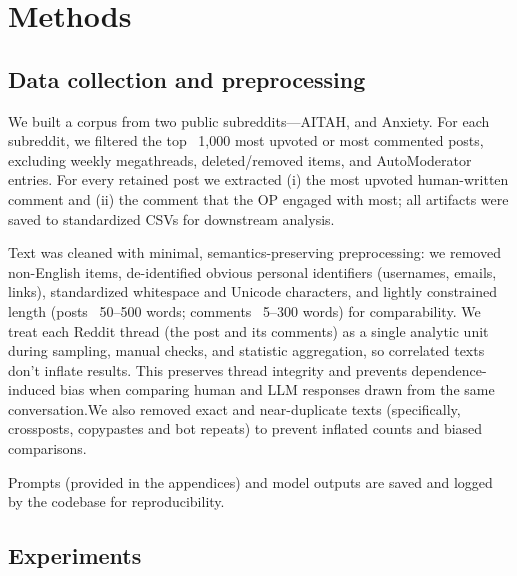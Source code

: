 
\section{Methods} \label{sec:Methods}
\textcolor{black!30}{\lipsum[11-12]}

\subsection{Data collection and preprocessing}
We built a corpus from two public subreddits—AITAH, and Anxiety. For each subreddit, we filtered the top ~1,000 most upvoted or most commented posts, excluding weekly megathreads, deleted/removed items, and AutoModerator entries. For every retained post we extracted (i) the most upvoted human-written comment and (ii) the comment that the OP engaged with most; all artifacts were saved to standardized CSVs for downstream analysis.

Text was cleaned with minimal, semantics-preserving preprocessing: we removed non-English items, de-identified obvious personal identifiers (usernames, emails, links), standardized whitespace and Unicode characters, and lightly constrained length (posts ~50–500 words; comments ~5–300 words) for comparability. We treat each Reddit thread (the post and its comments) as a single analytic unit during sampling, manual checks, and statistic aggregation, so correlated texts don’t inflate results. This preserves thread integrity and prevents dependence-induced bias when comparing human and LLM responses drawn from the same conversation.We also removed exact and near-duplicate texts (specifically, crossposts, copypastes and bot repeats) to prevent inflated counts and biased comparisons. 

\smallskip Prompts (provided in the appendices) and model outputs are saved and logged by the codebase for reproducibility.

\subsection{Experiments}
\textcolor{black!30}{\lipsum[12-14]}

